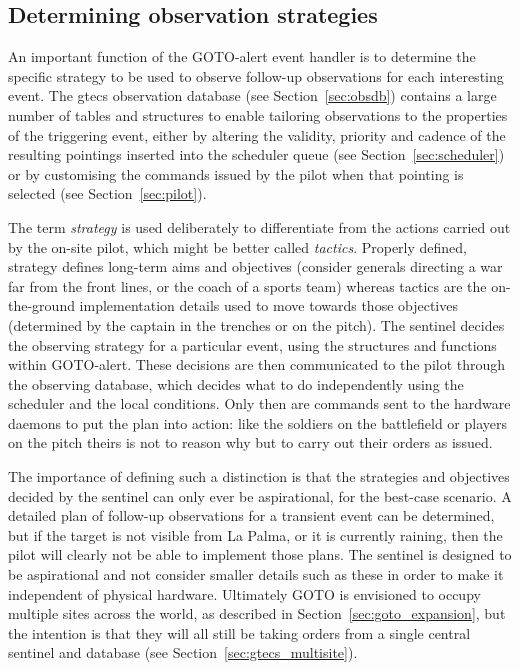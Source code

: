 \begin{colsection}
\subsection{Determining observation strategies}
\label{sec:event_strategy}
\begin{colsection}

An important function of the GOTO-alert event handler is to determine the specific strategy to be used to observe follow-up observations for each interesting event. The \gls{gtecs} observation database (see Section~\ref{sec:obsdb}) contains a large number of tables and structures to enable tailoring observations to the properties of the triggering event, either by altering the validity, priority and cadence of the resulting pointings inserted into the scheduler queue (see Section~\ref{sec:scheduler}) or by customising the commands issued by the pilot when that pointing is selected (see Section~\ref{sec:pilot}).

The term \textit{strategy} is used deliberately to differentiate from the actions carried out by the on-site pilot, which might be better called \textit{tactics}. Properly defined, strategy defines long-term aims and objectives (consider generals directing a war far from the front lines, or the coach of a sports team) whereas tactics are the on-the-ground implementation details used to move towards those objectives (determined by the captain in the trenches or on the pitch). The sentinel decides the observing strategy for a particular event, using the structures and functions within GOTO-alert. These decisions are then communicated to the pilot through the observing database, which decides what to do independently using the scheduler and the local conditions. Only then are commands sent to the hardware daemons to put the plan into action: like the soldiers on the battlefield or players on the pitch theirs is not to reason why but to carry out their orders as issued.

The importance of defining such a distinction is that the strategies and objectives decided by the sentinel can only ever be aspirational, for the best-case scenario. A detailed plan of follow-up observations for a transient event can be determined, but if the target is not visible from La Palma, or it is currently raining, then the pilot will clearly not be able to implement those plans. The sentinel is designed to be aspirational and not consider smaller details such as these in order to make it independent of physical hardware. Ultimately GOTO is envisioned to occupy multiple sites across the world, as described in Section~\ref{sec:goto_expansion}, but the intention is that they will all still be taking orders from a single central sentinel and database (see Section~\ref{sec:gtecs_multisite}).


\end{colsection}
\end{colsection}

